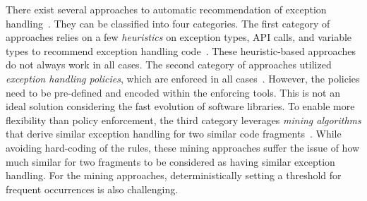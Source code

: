 There exist several approaches to automatic recommendation of 
exception
handling~\cite{barbosa-bsse12,chanchal-scam14,barbosa-tse18,barbosa-tse16,xrank-fse20,throw-ase22}. They
can be classified into four categories. The first category of
approaches relies on a few {\em heuristics} on exception types, API
calls, and variable types to recommend exception handling
code~\cite{barbosa-bsse12}. These heuristic-based approaches do not
always work in all cases. The second category of approaches
utilized {\em exception handling policies}, which are enforced in all
cases~\cite{barbosa-tse16,barbosa-saner18}. However, the policies need
to be pre-defined and encoded within the enforcing tools.  This is not
an ideal solution considering the fast evolution of software
libraries. To enable more flexibility than policy enforcement, the
third category leverages {\em mining algorithms} that derive
similar exception handling for two similar code
fragments~\cite{chanchal-scam14}. While avoiding hard-coding of
the rules, these mining approaches suffer the issue of how much similar
for two fragments to be considered as having similar exception
handling. For the mining approaches, deterministically setting a
threshold for frequent occurrences is also challenging.

